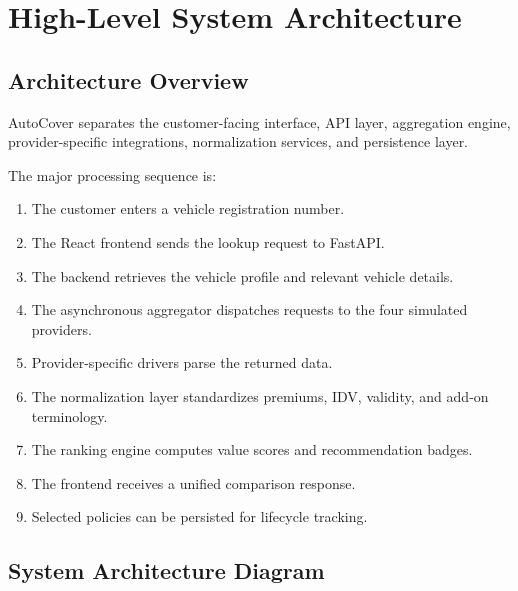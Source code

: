 \documentclass[11pt,a4paper]{article}
\begin{document}

\section{High-Level System Architecture}

\subsection{Architecture Overview}

AutoCover separates the customer-facing interface, API layer,
aggregation engine, provider-specific integrations, normalization
services, and persistence layer.

The major processing sequence is:

\begin{enumerate}
    \item The customer enters a vehicle registration number.
    \item The React frontend sends the lookup request to FastAPI.
    \item The backend retrieves the vehicle profile and relevant
    vehicle details.
    \item The asynchronous aggregator dispatches requests to the
    four simulated providers.
    \item Provider-specific drivers parse the returned data.
    \item The normalization layer standardizes premiums, IDV,
    validity, and add-on terminology.
    \item The ranking engine computes value scores and recommendation
    badges.
    \item The frontend receives a unified comparison response.
    \item Selected policies can be persisted for lifecycle tracking.
\end{enumerate}

\subsection{System Architecture Diagram}
\end{document}
